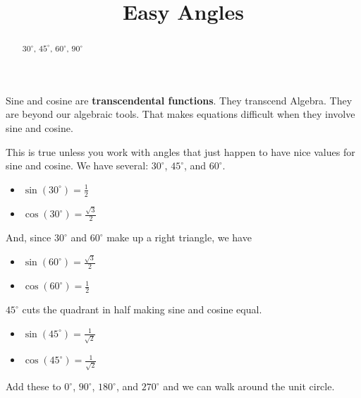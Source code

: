 \documentclass{ximera}
\title{Easy Angles}
\begin{document}
\begin{abstract}
$30^{\circ}$, $45^{\circ}$, $60^{\circ}$, $90^{\circ}$
\end{abstract}
\maketitle


Sine and cosine are \textbf{transcendental functions}.  They transcend Algebra. They are beyond our algebraic tools.  That makes equations difficult when they involve sine and cosine.


This is true unless you work with angles that just happen to have nice values for sine and cosine.  We have several: $30^{\circ}$, $45^{\circ}$, and $60^{\circ}$.




\begin{itemize}
\item $\sin(30^{\circ}) = \frac{1}{2}$
\item $\cos(30^{\circ}) = \frac{\sqrt{3}}{2}$
\end{itemize}


And, since $30^{\circ}$ and $60^{\circ}$ make up a right triangle, we have 


\begin{itemize}
\item $\sin(60^{\circ}) = \frac{\sqrt{3}}{2}$
\item $\cos(60^{\circ}) = \frac{1}{2}$
\end{itemize}




$45^{\circ}$ cuts the quadrant in half making sine and cosine equal.

\begin{itemize}
\item $\sin(45^{\circ}) = \frac{1}{\sqrt{2}}$
\item $\cos(45^{\circ}) = \frac{1}{\sqrt{2}}$
\end{itemize}



Add these to $0^{\circ}$, $90^{\circ}$, $180^{\circ}$, and $270^{\circ}$ and we can walk around the unit circle.
\end{document}
